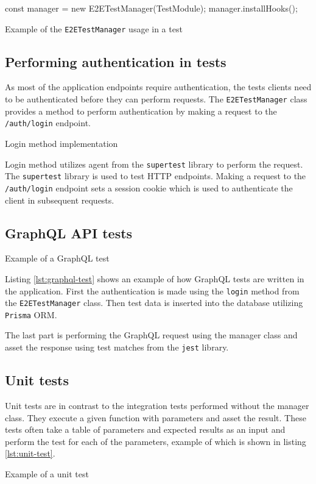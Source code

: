 \documentclass[../main.tex]{subfiles}
\begin{document}
\begin{listing}[H]
  \begin{tscode}
    const manager = new E2ETestManager(TestModule);
    manager.installHooks();
  \end{tscode}
  \caption{Example of the \texttt{E2ETestManager} usage in a test}
\end{listing}

\subsection{Performing authentication in tests}

As most of the application endpoints require authentication, the tests clients need to be authenticated before they can perform requests.
The \texttt{E2ETestManager} class provides a method to perform authentication by making a request to the \texttt{/auth/login} endpoint.

\begin{listing}[H]
  \caption{Login method implementation}
\end{listing}

Login method utilizes agent from the \texttt{supertest} library to perform the request. The \texttt{supertest} library is used to test HTTP endpoints.
Making a request to the \texttt{/auth/login} endpoint sets a session cookie which is used to authenticate the client in subsequent requests.

\subsection{GraphQL API tests}

\begin{listing}[H]
  \caption{Example of a GraphQL test}
  \label{lst:graphql-test}
\end{listing}

Listing \ref{lst:graphql-test} shows an example of how GraphQL tests are written in the application.
First the authentication is made using the \texttt{login} method from the \texttt{E2ETestManager} class.
Then test data is inserted into the database utilizing \texttt{Prisma} ORM.

The last part is performing the GraphQL request using the manager class and asset the response using test matches from the \texttt{jest} library.

\subsection{Unit tests}

Unit tests are in contrast to the integration tests performed without the manager class. They execute a given function with parameters and asset the result.
These tests often take a table of parameters and expected results as an input and perform the test for each of the parameters, example of which is shown in listing \ref{lst:unit-test}.

\begin{listing}[H]
  \caption{Example of a unit test}
  \label{lst:unit-test}
\end{listing}
\end{document}

